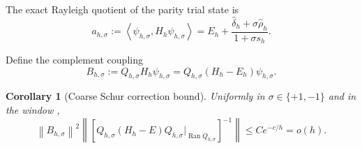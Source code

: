 \documentclass[11pt]{article}
\newtheorem{corollary}[theorem]{Corollary}
\newcommand{\norm}[1]{\left\|#1\right\|}
\newcommand{\ip}[2]{\left\langle #1,#2\right\rangle}
\newcommand{\Ran}{\operatorname{Ran}}
\begin{document}
The exact Rayleigh quotient of the parity trial state is
\begin{equation}\label{eq:exact-rayleigh}
 a_{h,\sigma}
 :=\ip{\psi_{h,\sigma}}{H_h\psi_{h,\sigma}}
 =E_h+\frac{\widehat\delta_h+\sigma\widehat\rho_h}
 {1+\sigma s_h}.
\end{equation}

Define the complement coupling
\begin{equation}\label{eq:B-sigma}
 B_{h,\sigma}
 :=Q_{h,\sigma}H_h\psi_{h,\sigma}
 =Q_{h,\sigma}(H_h-E_h)\psi_{h,\sigma}.
\end{equation}

\begin{corollary}[Coarse Schur correction bound]\label{cor:finite-certificate}
Uniformly in $\sigma\in\{+1,-1\}$ and in the window
,
\begin{equation}\label{eq:finite-certificate}
 \norm{B_{h,\sigma}}^2
 \left\|
 \left[
 Q_{h,\sigma}(H_h-E)Q_{h,\sigma}
 \big|_{\Ran Q_{h,\sigma}}
 \right]^{-1}
 \right\|
 \le Ce^{-c/h}=o(h).
\end{equation}
\end{corollary}
\end{document}
